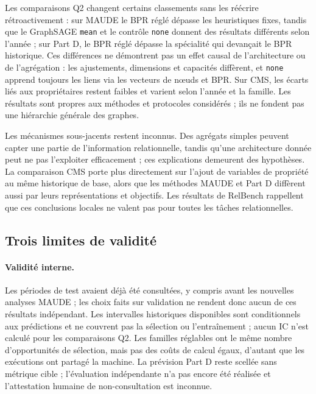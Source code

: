 Les comparaisons Q2 changent certains classements sans les réécrire rétroactivement : sur MAUDE le BPR réglé dépasse les heuristiques fixes, tandis que le GraphSAGE \texttt{mean} et le contrôle \texttt{none} donnent des résultats différents selon l'année ; sur Part D, le BPR réglé dépasse la spécialité qui devançait le BPR historique. Ces différences ne démontrent pas un effet causal de l'architecture ou de l'agrégation : les ajustements, dimensions et capacités diffèrent, et \texttt{none} apprend toujours les liens via les vecteurs de nœuds et BPR. Sur CMS, les écarts liés aux propriétaires restent faibles et varient selon l'année et la famille. Les résultats sont propres aux méthodes et protocoles considérés ; ils ne fondent pas une hiérarchie générale des graphes.

Les mécanismes sous-jacents restent inconnus. Des agrégats simples peuvent capter une partie de l'information relationnelle, tandis qu'une architecture donnée peut ne pas l'exploiter efficacement ; ces explications demeurent des hypothèses. La comparaison CMS porte plus directement sur l'ajout de variables de propriété au même historique de base, alors que les méthodes MAUDE et Part D diffèrent aussi par leurs représentations et objectifs. Les résultats de RelBench rappellent que ces conclusions locales ne valent pas pour toutes les tâches relationnelles\cite{robinson2024relbench,gu2026relbench}.

\subsection{Trois limites de validité}

\paragraph{Validité interne.} Les périodes de test avaient déjà été consultées, y compris avant les nouvelles analyses MAUDE ; les choix faits sur validation ne rendent donc aucun de ces résultats indépendant. Les intervalles historiques disponibles sont conditionnels aux prédictions et ne couvrent pas la sélection ou l'entraînement ; aucun IC n'est calculé pour les comparaisons Q2. Les familles réglables ont le même nombre d'opportunités de sélection, mais pas des coûts de calcul égaux, d'autant que les exécutions ont partagé la machine. La prévision Part D reste scellée sans métrique cible ; l'évaluation indépendante n'a pas encore été réalisée et l'attestation humaine de non-consultation est inconnue.

